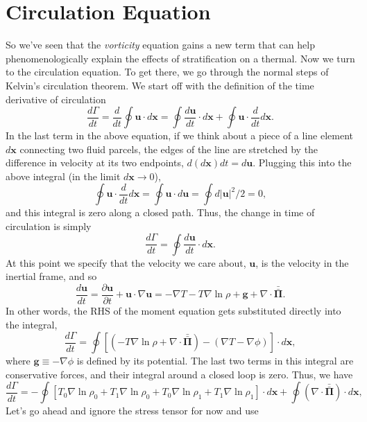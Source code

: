 \documentclass[onecolumn, amsmath, amsfonts, amssymb]{aastex62}
\newcommand{\grad}{\ensuremath{\nabla}}
\newcommand{\stressT}{\ensuremath{\bm{\bar{\bar{\Pi}}}}}
\begin{document}
\section{Circulation Equation}
So we've seen that the \emph{vorticity} equation gains a new term that can help
phenomenologically explain the effects of stratification on a thermal. Now we turn to
the circulation equation. To get there, we go through the normal steps of Kelvin's
circulation theorem. We start off with the definition of the time derivative of circulation
\begin{equation}
\frac{d\Gamma}{dt} = \frac{d}{dt} \oint \bm{u}\cdot d\bm{x} 
= \oint \frac{d \bm{u}}{dt}\cdot d\bm{x} + \oint \bm{u}\cdot\frac{d}{dt}d\bm{x}.
\end{equation}
In the last term in the above equation, if we think about a piece of a line element
$d\bm{x}$ connecting two fluid parcels, the edges of the line are stretched by the
difference in velocity at its two endpoints, $d( d\bm{x})dt = d\bm{u}$. Plugging this
into the above integral (in the limit $d\bm{x} \rightarrow 0$),
$$
\oint\bm{u}\cdot\frac{d}{dt}d\bm{x} = \oint \bm{u}\cdot d\bm{u}
= \oint d|\bm{u}|^2 / 2 = 0,
$$
and this integral is zero along a closed path. Thus, the change in time of circulation
is simply
\begin{equation}
\frac{d\Gamma}{dt} = \oint \frac{d\bm{u}}{dt} \cdot d\bm{x}.
\end{equation}
At this point we specify that the velocity we care about, $\bm{u}$, is the velocity
in the inertial frame, and so
\begin{equation}
\frac{d \bm{u}}{dt} = \frac{\partial \bm{u}}{\partial t} + \bm{u}\cdot\grad\bm{u}
= -\grad T - T \grad\ln\rho + \bm{g} + \grad\cdot\stressT.
\end{equation}
In other words, the RHS of the moment equation gets substituted directly into the integral,
$$
\frac{d\Gamma}{dt} = \oint \left[\left( - T \grad\ln\rho + \grad\cdot\stressT\right) -
\left(\grad T - \grad \phi\right)\right] \cdot d\bm{x},
$$
where $\bm{g} \equiv -\grad\phi$ is defined by its potential. The last two terms in this 
integral are conservative forces, and their integral around a closed loop is zero. Thus,
we have
\begin{equation}
\frac{d\Gamma}{dt} = -\oint\left[T_0\grad\ln\rho_0 + T_1\grad\ln\rho_0 + T_0\grad\ln\rho_1 +
T_1\grad\ln\rho_1\right]\cdot d\bm{x}
+ \oint (\grad\cdot\stressT)\cdot d\bm{x},
\end{equation}
Let's go ahead and ignore the stress tensor for now and use
\end{document}
